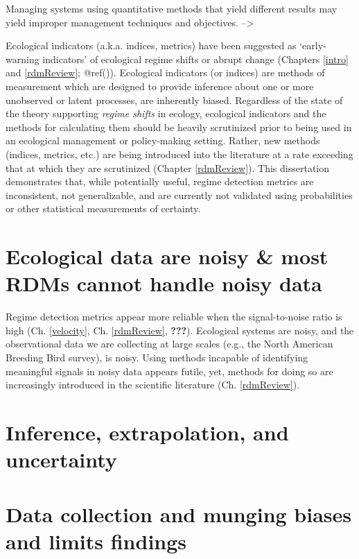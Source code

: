 \documentclass[12pt,twoside,openany]{reedthesis}
\begin{document}
Managing systems using quantitative methods that yield different results
may yield improper management techniques and objectives.
--\textgreater{}

Ecological indicators (a.k.a. indices, metrics) have been suggested as
`early-warning indicators' of ecological regime shifts or abrupt change
(Chapters \ref{intro} and \ref{rdmReview}; @ref()). Ecological
indicators (or indices) are methods of measurement which are designed to
provide inference about one or more unobserved or latent processes, are
inherently biased. Regardless of the state of the theory supporting
\emph{regime shifts} in ecology, ecological indicators and the methods
for calculating them should be heavily scrutinized prior to being used
in an ecological management or policy-making setting. Rather, new
methods (indices, metrics, etc.) are being introduced into the
literature at a rate exceeding that at which they are scrutinized
(Chapter \ref{rdmReview}). This dissertation demonstrates that, while
potentially useful, regime detection metrics are inconsistent, not
generalizable, and are currently not validated using probabilities or
other statistical measurements of certainty.

\section{Ecological data are noisy \& most RDMs cannot handle noisy
data}\label{ecological-data-are-noisy-most-rdms-cannot-handle-noisy-data}

Regime detection metrics appear more reliable when the signal-to-noise
ratio is high (Ch. \ref{velocity}, Ch. \ref{rdmReview}, {\textbf{???}}).
Ecological systems are noisy, and the observational data we are
collecting at large scales (e.g., the North American Breeding Bird
survey), is noisy. Using methods incapable of identifying meaningful
signals in noisy data appears futile, yet, methods for doing so are
increasingly introduced in the scientific literature (Ch.
\ref{rdmReview}).

\section{Inference, extrapolation, and
uncertainty}\label{inference-extrapolation-and-uncertainty}

\section{Data collection and munging biases and limits
findings}\label{data-collection-and-munging-biases-and-limits-findings}
\end{document}
